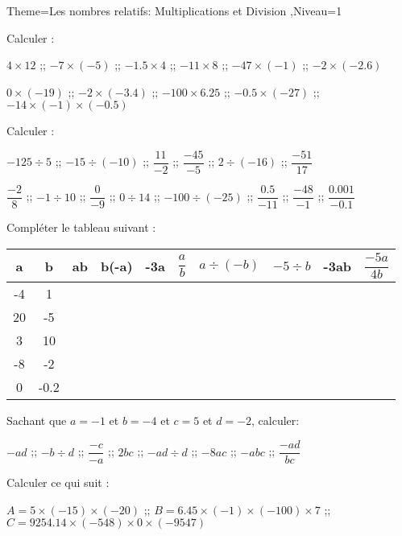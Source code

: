 \documentclass[a4paper,12pt]{article}
\begin{document}
\begin{Maquette}[Fiche]{Theme=Les nombres relatifs: Multiplications et Division ,Niveau=1}

\begin{exercice}
Calculer :
 
$4\times 12$ ;; $-7\times(-5)$ ;; $-1.5\times 4$ ;; $-11\times 8$ ;; $-47\times (-1)$ ;; $-2\times (-2.6)$

$0\times (-19)$ ;; $-2\times (-3.4)$ ;; $-100\times 6.25$ ;; $-0.5\times (-27)$ ;; $-14\times (-1)\times (-0.5)$
\end{exercice}

\begin{exercice}
Calculer :

$-125\div 5$ ;; $-15\div (-10)$ ;; $\dfrac{11}{-2}$ ;; $\dfrac{-45}{-5}$ ;; $2\div (-16)$ ;; $\dfrac{-51}{17}$

$\dfrac{-2}{8}$ ;; $-1\div 10$ ;; $\dfrac{0}{-9}$ ;; $0\div 14$ ;; $-100\div (-25)$ ;; $\dfrac{0.5}{-11}$ ;; $\dfrac{-48}{-1}$ ;; $\dfrac{0.001}{-0.1}$
\end{exercice}

\begin{exercice}
Compléter le tableau suivant :

\begin{tabular}{|c|c|c|c|c|c|c|c|c|c|}
\hline 
a & b & ab & b(-a) & -3a & $\dfrac{a}{b}$ & $a\div (-b)$ & $-5\div b$ & -3ab & $\dfrac{-5a}{4b}$ \\ 
\hline 
-4 & 1 &  &  &  &  &  &  &  &  \\ 
\hline 
20 & -5 &  &  &  &  &  &  &  &  \\ 
\hline 
3 & 10 &  &  &  &  &  &  &  &  \\ 
\hline 
-8 & -2 &  &  &  &  &  &  &  &  \\ 
\hline 
0 & -0.2 &  &  &  &  &  &  &  &  \\ 
\hline 
\end{tabular} 
\end{exercice}

\begin{exercice}
Sachant que $a=-1$ et $b=-4$ et $c=5$ et $d=-2$, calculer:

$-ad$ ;; $-b\div d$ ;; $\dfrac{-c}{-a}$ ;; $2bc$ ;; $-ad\div d$ ;; $-8ac$ ;; $-abc$ ;; $\dfrac{-ad}{bc}$
\end{exercice}

\begin{exercice}
Calculer ce qui suit :

$A=5\times (-15)\times (-20)$ ;; $B=6.45\times (-1)\times(-100)\times 7$ ;; $C=9254.14\times (-548)\times 0 \times (-9547)$


\end{exercice}
\end{Maquette}
\end{document}
